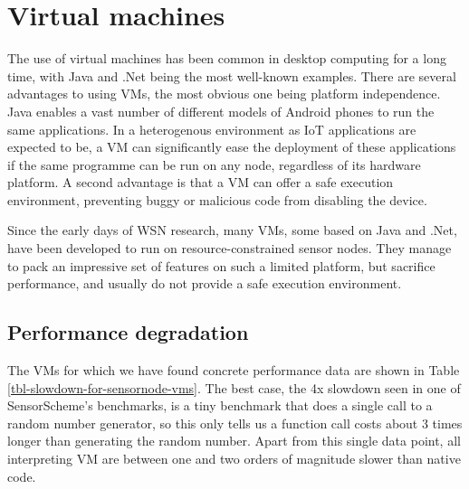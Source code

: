 \section{Virtual machines}
The use of virtual machines has been common in desktop computing for a long time, with Java and .Net being the most well-known examples. There are several advantages to using VMs, the most obvious one being platform independence. Java enables a vast number of different models of Android phones to run the same applications. In a heterogenous environment as IoT applications are expected to be, a VM can significantly ease the deployment of these applications if the same programme can be run on any node, regardless of its hardware platform. A second advantage is that a VM can offer a safe execution environment, preventing buggy or malicious code from disabling the device.


Since the early days of WSN research, many VMs, some based on Java and .Net, have been developed to run on resource-constrained sensor nodes. They manage to pack an impressive set of features on such a limited platform, but sacrifice performance, and usually do not provide a safe execution environment.

\subsection{Performance degradation}
\label{sec-introduction-performance}
The VMs for which we have found concrete performance data are shown in Table \ref{tbl-slowdown-for-sensornode-vms}. The best case, the 4x slowdown seen in one of SensorScheme's benchmarks, is a tiny benchmark that does a single call to a random number generator, so this only tells us a function call costs about 3 times longer than generating the random number. Apart from this single data point, all interpreting VM are between one and two orders of magnitude slower than native code.

